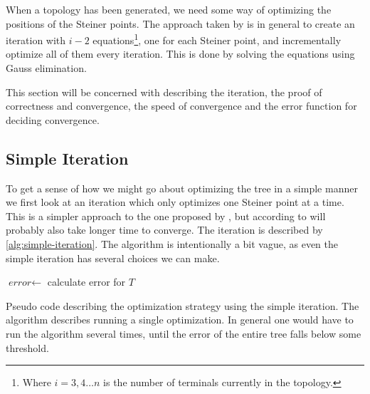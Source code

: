When a topology has been generated, we need some way of optimizing the positions of the
Steiner points. The approach taken by \citeauthor{smith1992} is in general to create an
iteration with $i-2$ equations\footnote{Where $i = 3, 4 \ldots n$ is the number of
  terminals currently in the topology.}, one for each Steiner point, and incrementally
optimize all of them every iteration. This is done by solving the equations
using Gauss elimination.

This section will be concerned with describing the iteration, the proof of
correctness and convergence, the speed of convergence and the error function for
deciding convergence.

\subsection{Simple Iteration}
\label{sec:simple-iteration}

To get a sense of how we might go about optimizing the tree in a simple
manner we first look at an iteration which only optimizes one Steiner point at a
time. This is a simpler approach to the one proposed by \textcite{smith1992},
but according to \citeauthor{smith1992} will probably also take longer time to
converge. The iteration is described by \cref{alg:simple-iteration}. The
algorithm is intentionally a bit vague, as even the simple iteration has several
choices we can make.

\begin{algorithm}[htbp]

  $\textit{error} \gets$ calculate error for $T$\;
  \caption[Algorithm for the simple iteration]{Pseudo code describing the optimization strategy
    using the simple iteration. The algorithm describes running a single
    optimization. In general one would have to run the algorithm several times,
    until the error of the entire tree falls below some threshold.\label{alg:simple-iteration}}
\end{algorithm}

